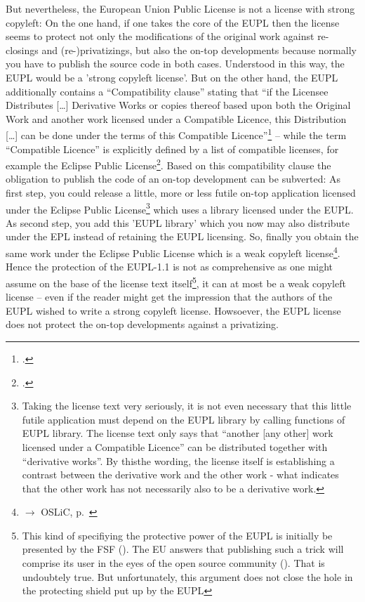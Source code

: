 But nevertheless, the European Union Public License is not a license with strong
copyleft: On the one hand, if one takes the core of the EUPL then the license
seems to protect not only the modifications of the original work against
re-closings and (re-)privatizings, but also the on-top developments because
normally you have to publish the source code in both cases. Understood in this
way, the EUPL would be a 'strong copyleft license'. But on the other hand, the
EUPL additionally contains a \enquote{Compatibility clause} stating that
\enquote{if the Licensee Distributes [\ldots] Derivative Works or copies thereof
based upon both the Original Work and another work licensed under a Compatible
Licence, this Distribution [\ldots] can be done under the terms of this
Compatible Licence}\footcite[cf.][\nopage wp\ §5]{EuplLicense2007en} -- while
the term \enquote{Compatible Licence} is explicitly defined by a list of
compatible licenses, for example the Eclipse Public
License\footcite[cf.][\nopage wp\ Appendix]{EuplLicense2007en}. Based on this
compatibility clause the obligation to publish the code of an on-top development
can be subverted: As first step, you could release a little, more or less futile
on-top application licensed under the Eclipse Public License\footnote{Taking the
license text very seriously, it is not even necessary that this little futile
application must depend on the EUPL library by calling functions of EUPL
library. The license text only says that \enquote{another [any other] work
licensed under a Compatible Licence} can be distributed together with
\enquote{derivative works}. By thisthe wording, the license itself is
establishing a contrast between the derivative work and the other work - what
indicates that the other work has not necessarily also to be a derivative work.}
which uses a library licensed under the EUPL. As second step, you add this 'EUPL
library' which you now may also distribute under the EPL instead of retaining
the EUPL licensing. So, finally you obtain the same work under the Eclipse
Public License which is a weak copyleft license\footnote{$\rightarrow$ OSLiC,
p.\ \pageref{sec:ProtectingPowerOfEpl}}. Hence the protection of the EUPL-1.1 is
not as comprehensive as one might assume on the base of the license text
itself\footnote{This kind of specifiying the protective power of the EUPL is
initially be presented by the FSF (\cite[cf.][wp\ section 'European Union
Public License']{FsfLicenseList2013a}). The EU answers that publishing such a
trick will comprise its user in the eyes of the open source community
(\cite[cf.][wp]{FsfEuplRecomment2013}). That is undoubtely true. But
unfortunately, this argument does not close the hole in the protecting shield
put up by the EUPL}, it can at most be a weak copyleft license -- even if the
reader might get the impression that the authors of the EUPL wished to write a
strong copyleft license. Howsoever, the EUPL license does not protect the on-top
developments against a privatizing.

